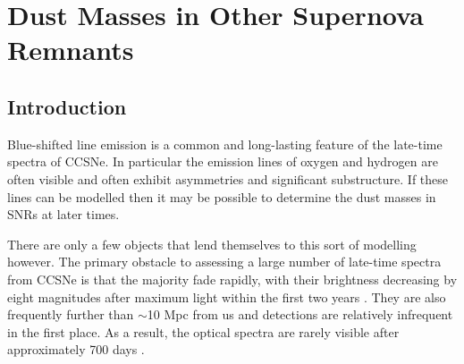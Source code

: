 \chapter{Dust Masses in Other Supernova Remnants}\label{chp:chp6}

%
%


\section{Introduction}

Blue-shifted line emission is a common and long-lasting feature of the late-time spectra of CCSNe.  In particular the emission lines of oxygen and hydrogen are often visible and often exhibit asymmetries and significant substructure.  If these lines can be modelled then it may be possible to determine the dust masses in SNRs at later times.

There are only a few objects that lend themselves to this sort of modelling however.  The primary obstacle to assessing a large number of late-time spectra from CCSNe is that the majority fade rapidly,  with their brightness decreasing by eight magnitudes after maximum light within the first two years \citep{Kirshner1990}.  They are also frequently further than $\sim$10 Mpc from us and detections are relatively infrequent in the first place.  As a result, the optical spectra are rarely visible after approximately 700 days \citep{Milisavljevic2012}.  


